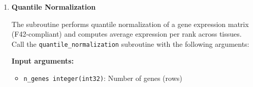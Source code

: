 \documentclass[11pt]{article}
\begin{document}
\begin{enumerate}
\begin{enumerate}
	      	      The subroutine normalizes each gene's expression vector using \texttt{sqrt(mean(x\textasciicircum
	      	      	2))} across tissues (not classical standard deviation). Call the \texttt{normalize\_by\_std\_dev}
	      	      subroutine with the following arguments:
	      	      
	      	      \textbf{Input arguments:}
	      	      \begin{itemize}
	      	      	\item \texttt{n\_genes integer(int32)}: Number of genes (rows)
	      	      	      
	      	      	\item \texttt{n\_tissues integer(int32)}: Number of tissues (columns)
	      	      	      
	      	      	\item \texttt{input\_matrix real(real64)}: Flattened input matrix of
	      	      	      gene expression values (column-major)
	      	      \end{itemize}
	      	      \textbf{Output arguments:}
	      	      \begin{itemize}
	      	      	\item \texttt{output\_matrix real(real64)}: Output normalized matrix
	      	      	      (same shape as input)
	      	      	      
	      	      	\item \texttt{ierr integer(int32)}: Error code (for error details
	      	      	      please check \hyperref[sec:error-handling]{error handling section}
	      	      	      )
	      	      \end{itemize}
	      	      \begin{lstlisting}[language=Fortran, caption={Standard Deviation Normalization}]
call normalize_by_std_dev(n_genes, n_tissues, input_matrix, output_matrix, ierr)
	      	      \end{lstlisting}
	      	      
	      	\item \textbf{Quantile Normalization}
	      	      
	      	      The subroutine performs quantile normalization of a gene expression matrix
	      	      (F42-compliant) and computes average expression per rank across tissues.
	      	      Call the \texttt{quantile\_normalization} subroutine with the following
	      	      arguments:
	      	      
	      	      \textbf{Input arguments:}
	      	      \begin{itemize}
	      	      	\item \texttt{n\_genes integer(int32)}: Number of genes (rows)
	      	      	      

\end{itemize}
\end{enumerate}
\end{enumerate}
\end{document}
